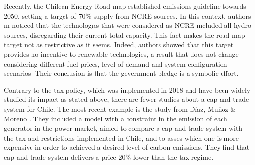 \documentclass[11pt, letterpaper]{article}
\begin{document}
\smallskip


Recently, the Chilean Energy Road-map established emissions guideline towards 2050, setting a target of 70\% supply from NCRE sources. In this context, authors in \cite{munoz2017aiming} noticed that the technologies that were considered as NCRE included all hydro sources, disregarding their current total capacity. This fact makes the road-map target not as restrictive as it seems. Indeed, authors showed that this target provides no incentive to renewable technologies, a result that does not change considering different fuel prices, level of demand and system configuration scenarios. Their conclusion is that the government pledge is a symbolic effort. 

\smallskip

Contrary to the tax policy, which was implemented in 2018 and have been widely studied its impact as stated above, there are fewer studies about a cap-and-trade system for Chile. The most recent example is the study from D\'iaz, Mu\~{n}oz \& Moreno \cite{diaz2020equilibrium}. They included a model with a constraint in the emission of each generator in the power market, aimed to compare a cap-and-trade system with the tax and restrictions implemented in Chile, and to asses which one is more expensive in order to achieved a desired level of carbon emissions. They find that cap-and trade system delivers a price 20\% lower than the tax regime. 

\smallskip
\end{document}
